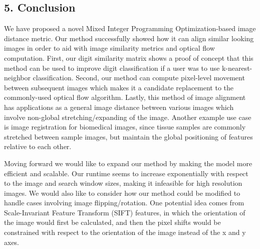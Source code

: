 \documentclass[11pt]{article}
\makeatletter
\newcommand{\boxspacing}{\kern\kvtcb@left@rule\kern\kvtcb@boxsep}
\newcommand{\prompt}[4]{
        {\ttfamily\llap{{\color{#2}[#3]:\hspace{3pt}#4}}\vspace{-\baselineskip}}
    }
\makeatother
\begin{document}
    \hypertarget{conclusion}{%
\subsection{5. Conclusion}\label{conclusion}}

We have proposed a novel Mixed Integer Programming Optimization-based
image distance metric. Our method successfully showed how it can align
similar looking images in order to aid with image similarity metrics and
optical flow computation. First, our digit similarity matrix shows a
proof of concept that this method can be used to improve digit
classification if a user was to use k-nearest-neighbor classification.
Second, our method can compute pixel-level movement between subsequent
images which makes it a candidate replacement to the commonly-used
optical flow algorithm. Lastly, this method of image alignment has
applications as a general image distance between various images which
involve non-global stretching/expanding of the image. Another example
use case is image registration for biomedical images, since tissue
samples are commonly stretched between sample images, but maintain the
global positioning of features relative to each other.

Moving forward we would like to expand our method by making the model
more efficient and scalable. Our runtime seems to increase exponentially
with respect to the image and search window sizes, making it infeasible
for high resolution images. We would also like to consider how our
method could be modified to handle cases involving image
flipping/rotation. One potential idea comes from Scale-Invariant Feature
Transform (SIFT) features, in which the orientation of the image would
first be calculated, and then the pixel shifts would be constrained with
respect to the orientation of the image instead of the x and y axes.

    \begin{tcolorbox}[breakable, size=fbox, boxrule=1pt, pad at break*=1mm,colback=cellbackground, colframe=cellborder]
\prompt{In}{incolor}{ }{\boxspacing}
\begin{Verbatim}[commandchars=\\\{\}]

\end{Verbatim}
\end{tcolorbox}


    
    
    
\end{document}
